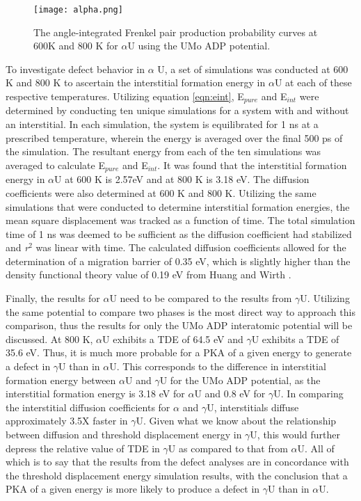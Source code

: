 \documentclass[review]{elsarticle}
\begin{document}
\begin{figure}[h]
 \centering
 \texttt{[image: alpha.png]} %
 \caption{The angle-integrated Frenkel pair production probability curves at 600K and 800 K for $\alpha$U using the UMo ADP potential.}
 \label{fig:alpha}
\end{figure}

\FloatBarrier

To investigate defect behavior in $\alpha$ U, a set of simulations was conducted at 600 K and 800 K to ascertain the interstitial formation energy in $\alpha$U at each of these respective temperatures. Utilizing equation \ref{eqn:eint}, E$_{pure}$ and E$_{int}$ were determined by conducting ten unique simulations for a system with and without an interstitial. In each simulation, the system is equilibrated for 1 ns at a prescribed temperature, wherein the energy is averaged over the final 500 ps of the simulation. The resultant energy from each of the ten simulations was averaged to calculate E$_{pure}$ and E$_{int}$. It was found that the interstitial formation energy in $\alpha$U at 600 K is 2.57eV and at 800 K is 3.18 eV. The diffusion coefficients were also determined at 600 K and 800 K. Utilizing the same simulations that were conducted to determine interstitial formation energies, the mean square displacement was tracked as a function of time. The total simulation time of 1 ns was deemed to be sufficient as the diffusion coefficient had stabilized and \textit{r}$^{2}$ was linear with time. The calculated diffusion coefficients allowed for the determination of a migration barrier of 0.35 eV, which is slightly higher than the density functional theory value of 0.19 eV from Huang and Wirth \cite{wirth2011}. 

Finally, the results for $\alpha$U need to be compared to the results from $\gamma$U. Utilizing the same potential to compare two phases is the most direct way to approach this comparison, thus the results for only the UMo ADP interatomic potential \cite{smirnovaADP} will be discussed. At 800 K, $\alpha$U exhibits a TDE of 64.5 eV and $\gamma$U exhibits a TDE of 35.6 eV. Thus, it is much more probable for a PKA of a given energy to generate a defect in $\gamma$U than in $\alpha$U. This corresponds to the difference in interstitial formation energy between $\alpha$U and $\gamma$U for the UMo ADP potential, as the interstitial formation energy is 3.18 eV for $\alpha$U and 0.8 eV for $\gamma$U. In comparing the interstitial diffusion coefficients for $\alpha$ and $\gamma$U, interstitials diffuse approximately 3.5X faster in $\gamma$U. Given what we know about the relationship between diffusion and threshold displacement energy in $\gamma$U, this would further depress the relative value of TDE in $\gamma$U as compared to that from $\alpha$U. All of which is to say that the results from the defect analyses are in concordance with the threshold displacement energy simulation results, with the conclusion that a PKA of a given energy is more likely to produce a defect in $\gamma$U than in $\alpha$U. 
\end{document}
